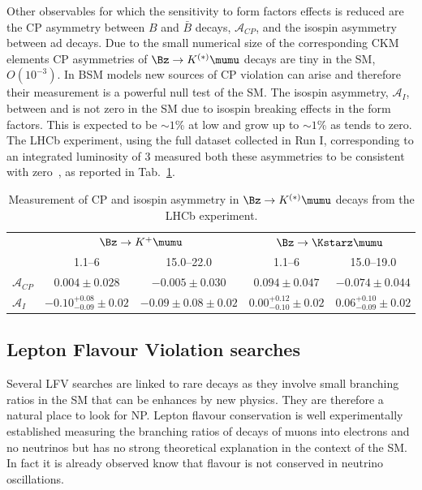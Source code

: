 Other observables for which the sensitivity to form factors effects is reduced are the CP asymmetry between
$B$ and $\bar{B}$ decays, $\mathcal{A}_{CP}$, and the isospin asymmetry between \Bz ad \Bu decays.
Due to the small numerical size of the corresponding CKM elements CP asymmetries of $\Bz\to K^{(*)}\mumu$
decays are tiny in the SM, $O(10^{-3})$. In BSM models new sources of CP violation can arise and therefore
their measurement is a powerful null test of the SM. 
The isospin asymmetry, $\mathcal{A}_{I}$, between \Bu and \Bz is not zero in the SM due
to isospin breaking effects in the form factors.
This is expected to be $\sim1$\% at low \qsq and grow up to $\sim1$\% as \qsq tends to zero.
The LHCb experiment, using the full dataset collected in Run I, corresponding to an integrated luminosity of
3 \invfb measured both these asymmetries to be consistent with zero~\cite{LHCB-PAPER-2014-006,LHCB-PAPER-2014-032}, as reported in Tab.~\ref{tab:AcpAI}. 
%
\begin{table}
\begin{small}
\begin{tabular}{l|cc|cc}
					& \multicolumn{2}{c|}{$\Bz\to K^+\mumu$}			&\multicolumn{2}{c}{$\Bz\to \Kstarz\mumu$}	\\
\qsq [\gevgevcccc]		& 1.1--6 			 			& 15.0--22.0 				& 	1.1--6 & 15.0--19.0 \\ \hline
$\mathcal{A}_{CP}$  & $0.004 \pm 0.028$	 			& $-0.005 \pm 0.030$		&	$0.094 \pm 0.047$	& $-0.074 \pm 0.044$ \\
$\mathcal{A}_{I}$	& $-0.10^{+0.08}_{-0.09} \pm 0.02$	& $-0.09 \pm 0.08 \pm 0.02$	&	$0.00^{+0.12}_{-0.10} \pm 0.02$  &	$0.06^{+0.10}_{-0.09} \pm 0.02$ \\
\end{tabular}
\end{small}
\caption{Measurement of CP and isospin asymmetry in $\Bz\to K^{(*)}\mumu$ decays from the LHCb experiment.  }
\label{tab:AcpAI}
\end{table}

\subsection{Lepton Flavour Violation searches}

Several LFV searches are linked to rare decays as they involve small branching ratios
in the SM that can be enhances by new physics. They are therefore a natural place to look for NP.
Lepton flavour conservation is well experimentally established measuring the branching ratios of
decays of muons into electrons and no neutrinos but has no strong theoretical
explanation in the context of the SM. In fact it is already observed know that flavour
is not conserved in neutrino oscillations. 


